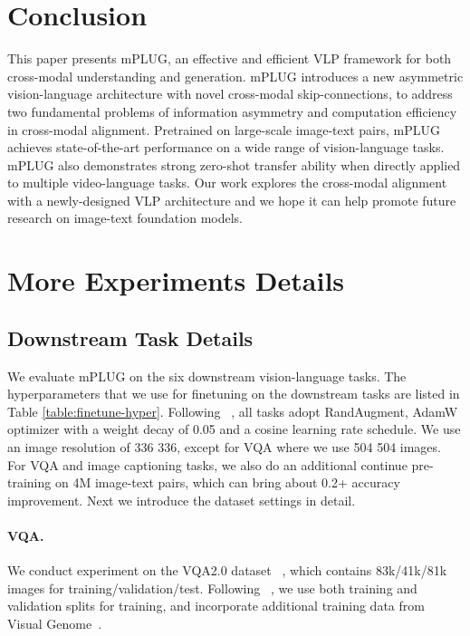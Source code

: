 \documentclass[11pt]{article}
\newcommand{\modelname}{mPLUG }
\begin{document}
\section{Conclusion} This paper presents mPLUG, an effective and efficient VLP framework for both cross-modal understanding and generation. \modelname introduces a new asymmetric vision-language architecture with novel cross-modal skip-connections, to address two fundamental problems of information asymmetry and computation efficiency in cross-modal alignment. Pretrained on large-scale image-text pairs, \modelname achieves state-of-the-art performance on a wide range of vision-language tasks. \modelname also demonstrates strong zero-shot transfer ability when directly applied to multiple video-language tasks. Our work explores the cross-modal alignment with a newly-designed VLP architecture and we hope it can help promote future research on image-text foundation models. 














\section{More Experiments Details}
\label{sec:app_expr}
\subsection{Downstream Task Details}
We evaluate mPLUG on the six downstream vision-language tasks. The hyperparameters that we use for finetuning on the downstream  tasks are listed in Table \ref{table:finetune-hyper}. Following ~\citep{li2021align}, all tasks adopt RandAugment, AdamW optimizer with a weight decay of 0.05 and a cosine learning rate schedule. We use an image resolution of 336  336, except for VQA where we use 504  504 images. For VQA and image captioning tasks, we also do an additional continue pre-training on 4M image-text pairs, which can bring about 0.2+ accuracy improvement. Next we introduce the dataset settings in detail.




\paragraph{VQA.} We conduct experiment on the VQA2.0 dataset ~\citep{goyal2017making}, which contains 83k/41k/81k images for training/validation/test. Following ~\citep{li2021align}, we use both training and validation splits for training, and incorporate additional training data from Visual Genome~\citep{krishna2017visual}.
\end{document}
